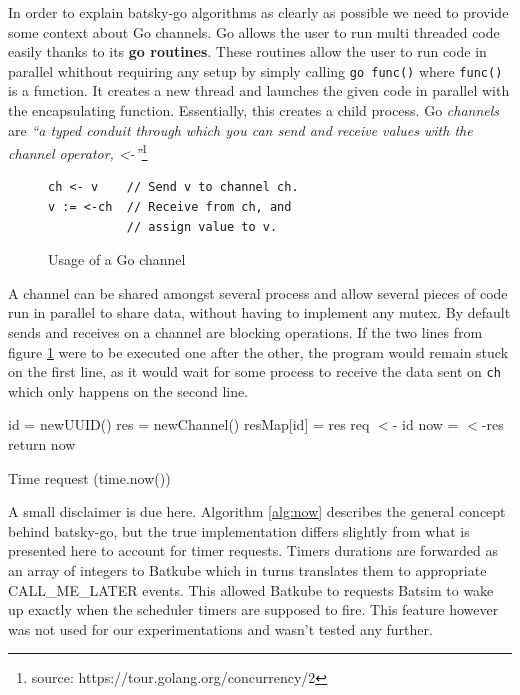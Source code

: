 In order to explain batsky-go algorithms as clearly as possible we need to
provide some context about Go channels. Go allows the user to run multi
threaded code easily thanks to its \textbf{go routines}. These routines allow
the user to run code in parallel whithout requiring any setup by simply calling
\texttt{go func()} where \texttt{func()} is a function.  It creates a new
thread and launches the given code in parallel with the encapsulating function.
Essentially, this creates a child process.  Go \textit{channels} are
\textit{``a typed conduit through which you can send and receive values with
the channel operator, <-''}\footnote{source:
https://tour.golang.org/concurrency/2}

\begin{figure}[]
	\begin{verbatim}
ch <- v    // Send v to channel ch.
v := <-ch  // Receive from ch, and
           // assign value to v.
   \end{verbatim}
   \caption{Usage of a Go channel}
   \label{fig:go-channel}
\end{figure}

A channel can be shared amongst several process and allow several pieces of
code run in parallel to share data, without having to implement any mutex. By
default sends and receives on a channel are blocking operations. If the two
lines from figure \ref{fig:go-channel} were to be executed one after the other,
the program would remain stuck on the first line, as it would wait for some
process to receive the data sent on \texttt{ch} which only happens on the
second line.\\


\begin{algorithm}[]
\DontPrintSemicolon
{}

id = newUUID()\;
res = newChannel()\;
resMap[id] = res 
req $<$- id 
now = $<$-res 
return now\;
\caption{Time request (time.now())}
\label{alg:now}
\end{algorithm}

A small disclaimer is due here. Algorithm \ref{alg:now} describes the general
concept behind batsky-go, but the true implementation differs slightly from
what is presented here to account for timer requests. Timers durations are
forwarded as an array of integers to Batkube which in turns translates them to
appropriate CALL\_ME\_LATER events. This allowed Batkube to requests Batsim to
wake up exactly when the scheduler timers are supposed to fire. This feature
however was not used for our experimentations and wasn't tested any further.

